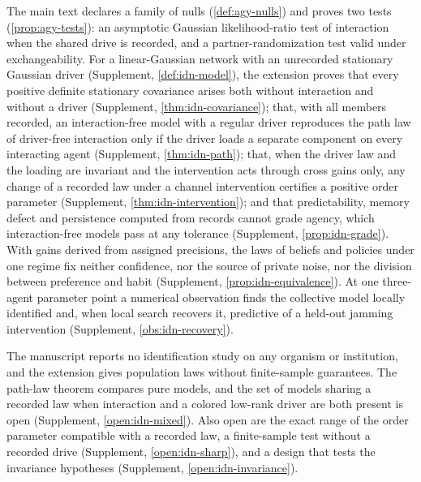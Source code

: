 The main text declares a family of nulls (\cref{def:agy-nulls}) and proves two tests (\cref{prop:agy-tests}): an asymptotic Gaussian likelihood-ratio test of interaction when the shared drive is recorded, and a partner-randomization test valid under exchangeability. For a linear-Gaussian network with an unrecorded stationary Gaussian driver (Supplement, \cref{def:idn-model}), the extension proves that every positive definite stationary covariance arises both without interaction and without a driver (Supplement, \cref{thm:idn-covariance}); that, with all members recorded, an interaction-free model with a regular driver reproduces the path law of driver-free interaction only if the driver loads a separate component on every interacting agent (Supplement, \cref{thm:idn-path}); that, when the driver law and the loading are invariant and the intervention acts through cross gains only, any change of a recorded law under a channel intervention certifies a positive order parameter (Supplement, \cref{thm:idn-intervention}); and that predictability, memory defect and persistence computed from records cannot grade agency, which interaction-free models pass at any tolerance (Supplement, \cref{prop:idn-grade}). With gains derived from assigned precisions, the laws of beliefs and policies under one regime fix neither confidence, nor the source of private noise, nor the division between preference and habit (Supplement, \cref{prop:idn-equivalence}). At one three-agent parameter point a numerical observation finds the collective model locally identified and, when local search recovers it, predictive of a held-out jamming intervention (Supplement, \cref{obs:idn-recovery}).

The manuscript reports no identification study on any organism or institution, and the extension gives population laws without finite-sample guarantees. The path-law theorem compares pure models, and the set of models sharing a recorded law when interaction and a colored low-rank driver are both present is open (Supplement, \cref{open:idn-mixed}). Also open are the exact range of the order parameter compatible with a recorded law, a finite-sample test without a recorded drive (Supplement, \cref{open:idn-sharp}), and a design that tests the invariance hypotheses (Supplement, \cref{open:idn-invariance}).

